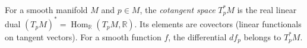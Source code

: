 
For a smooth manifold $M$ and $p\in M$, the \emph{cotangent space} $T_p^*M$ is the real linear dual $(T_pM)^*=\operatorname{Hom}_{\mathbb R}(T_pM,\mathbb R)$. Its elements are covectors (linear functionals on tangent vectors). For a smooth function $f$, the differential $df_p$ belongs to $T_p^*M$.
